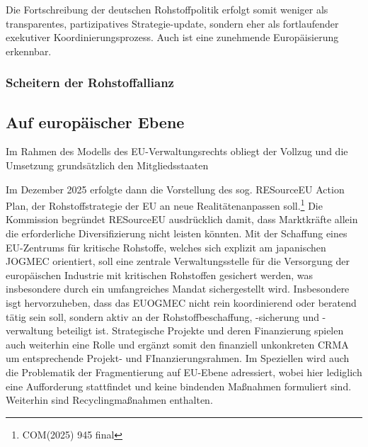 \documentclass[12pt,a4paper,oneside]{book} %
\begin{document}
Die Fortschreibung der deutschen Rohstoffpolitik erfolgt somit weniger als transparentes, partizipatives Strategie-update, sondern eher als fortlaufender exekutiver Koordinierungsprozess. Auch ist eine zunehmende Europäisierung erkennbar.
\subsubsection{Scheitern der Rohstoffallianz}

\subsection{Auf europäischer Ebene}

Im Rahmen des Modells des EU-Verwaltungsrechts obliegt der Vollzug und die Umsetzung grundsätzlich den Mitgliedsstaaten


Im Dezember 2025 erfolgte dann die Vorstellung des sog. RESourceEU Action Plan, der Rohstoffstrategie der EU an \glqq neue Realitäten\grqq anpassen soll.\footnote{COM(2025) 945 final} Die Kommission begründet RESourceEU ausdrücklich damit, dass Marktkräfte allein die erforderliche Diversifizierung nicht leisten könnten. 
Mit der Schaffung eines EU-Zentrums für kritische Rohstoffe, welches sich explizit am japanischen JOGMEC orientiert, soll eine zentrale Verwaltungsstelle für die Versorgung der europäischen Industrie mit kritischen Rohstoffen gesichert werden, was insbesondere durch ein umfangreiches Mandat sichergestellt wird. Insbesondere isgt hervorzuheben, dass das EUOGMEC nicht rein koordinierend oder beratend tätig sein soll, sondern aktiv an der Rohstoffbeschaffung, -sicherung und -verwaltung beteiligt ist.
Strategische Projekte und deren Finanzierung spielen auch weiterhin eine Rolle und ergänzt somit den finanziell unkonkreten CRMA um entsprechende Projekt- und FInanzierungsrahmen. Im Speziellen wird auch die Problematik der Fragmentierung auf EU-Ebene adressiert, wobei hier lediglich eine Aufforderung stattfindet und keine bindenden Maßnahmen formuliert sind. Weiterhin sind Recyclingmaßnahmen enthalten. 
\end{document}
